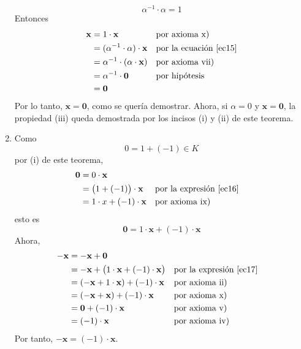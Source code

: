 \begin{theorem}{}{}
\begin{enumerate}[label=\roman*., topsep=6pt, itemsep=0pt]
        \begin{equation}
            \alpha^{-1} \cdot \alpha = 1 \label{ec15}
        \end{equation}
        Entonces
        \begin{align*}
            \mathbf{x} & = 1 \cdot \mathbf{x} && \text{por axioma x)} \\
            & = (\alpha^{-1} \cdot \alpha) \cdot \mathbf{x} && \text{por la ecuación \eqref{ec15}} \\
            & = \alpha^{-1} \cdot (\alpha \cdot \mathbf{x}) && \text{por axioma vii)} \\
            & = \alpha^{-1} \cdot \mathbf{0} && \text{por hipótesis} \\
            & = \mathbf{0}
        \end{align*}
        Por lo tanto, $\mathbf{x} = \mathbf{0}$, como se quería demostrar. Ahora, si $\alpha = 0$ y $\mathbf{x} = \mathbf{0}$, la propiedad (iii) queda demostrada por los incisos (i) y (ii) de este teorema.
        \item Como
        \begin{equation}
            0 = 1 + (-1) \in K \label{ec16}
        \end{equation}
        por (i) de este teorema,
        \begin{align*}
            \mathbf{0} & = 0 \cdot \mathbf{x} \\
            & = \big( 1 + (-1) \big) \cdot \mathbf{x} && \text{por la expresión \eqref{ec16}} \\
            & = 1 \cdot x +  (-1) \cdot \mathbf{x} && \text{por axioma ix)}
        \end{align*}
        esto es
        \begin{equation}
            \mathbf{0} = 1 \cdot \mathbf{x} + (-1) \cdot \mathbf{x} \label{ec17}
        \end{equation}
        Ahora,
        \begin{align*}
            -\mathbf{x} & = - \mathbf{x} + \mathbf{0} \\
            & = -\mathbf{x} + \big( 1 \cdot \mathbf{x} + (-1) \cdot \mathbf{x} \big) && \text{por la expresión \eqref{ec17}} \\
            & = (-\mathbf{x} + 1 \cdot \mathbf{x}) + (-1) \cdot \mathbf{x} && \text{por axioma ii)} \\
            & = (-\mathbf{x} + \mathbf{x}) + (-1) \cdot \mathbf{x} && \text{por axioma x)} \\
            & = \mathbf{0} + (-1) \cdot \mathbf{x} && \text{por axioma v)} \\
            & = (-1) \cdot \mathbf{x} && \text{por axioma iv)}
        \end{align*}
        Por tanto, $-\mathbf{x} = (-1) \cdot \mathbf{x}$.
    \end{enumerate}
\end{theorem}

